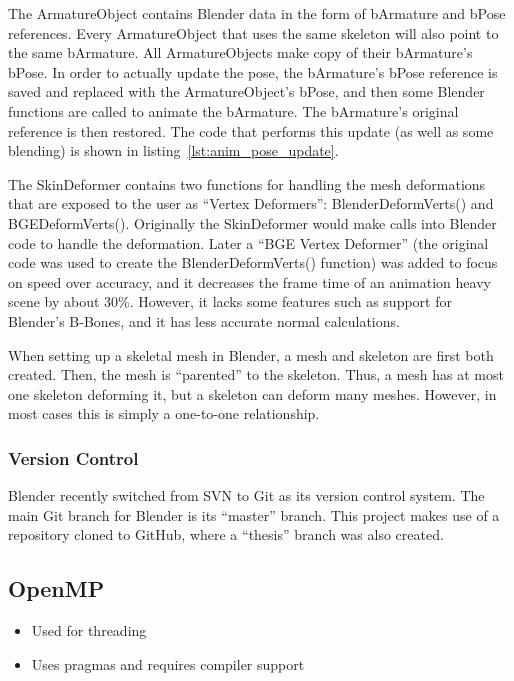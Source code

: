 The ArmatureObject contains Blender data in the form of bArmature and bPose references.
Every ArmatureObject that uses the same skeleton will also point to the same bArmature.
All ArmatureObjects make copy of their bArmature's bPose.
In order to actually update the pose, the bArmature's bPose reference is saved and replaced with the ArmatureObject's bPose, and then some Blender functions are called to animate the bArmature.
The bArmature's original reference is then restored.
The code that performs this update (as well as some blending) is shown in listing~\ref{lst:anim_pose_update}.


The SkinDeformer contains two functions for handling the mesh deformations that are exposed to the user as ``Vertex Deformers'': BlenderDeformVerts() and BGEDeformVerts().
Originally the SkinDeformer would make calls into Blender code to handle the deformation.
Later a ``BGE Vertex Deformer'' (the original code was used to create the BlenderDeformVerts() function) was added to focus on speed over accuracy, and it decreases the frame time of an animation heavy scene by about 30\%.
However, it lacks some features such as support for Blender's B-Bones, and it has less accurate normal calculations.

When setting up a skeletal mesh in Blender, a mesh and skeleton are first both created.
Then, the mesh is ``parented'' to the skeleton.
Thus, a mesh has at most one skeleton deforming it, but a skeleton can deform many meshes.
However, in most cases this is simply a one-to-one relationship.

\subsubsection{Version Control}

Blender recently switched from SVN to Git\cite{git} as its version control system\cite{blendergit}.
The main Git branch for Blender is its ``master'' branch.
This project makes use of a repository cloned to GitHub\cite{github}, where a ``thesis'' branch was also created.

\subsection{OpenMP}
\ifsummaries
\begin{itemize}
 \item Used for threading
 \item Uses pragmas and requires compiler support
\end{itemize}
\fi

